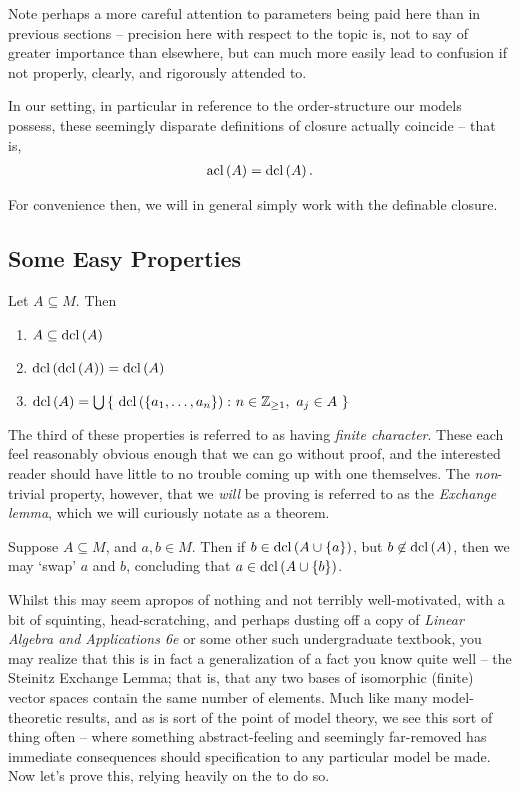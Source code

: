 Note perhaps a more careful attention to parameters being paid here than in previous sections -- precision here with respect to the topic is, not to say of greater importance than elsewhere, but can much more easily lead to confusion if not properly, clearly, and rigorously attended to.


In our setting, in particular in reference to the order-structure our models possess, these seemingly disparate definitions of closure actually coincide -- that is,
\begin{align*}
  \operatorname{acl}\left(A\right) = \operatorname{dcl}\left(A\right).
\end{align*}

For convenience then, we will in general simply work with the definable closure.

\subsection{Some Easy Properties}

\begin{proposition}
\leavevmode
Let $A \subseteq M$. Then
  \begin{enumerate}
    \item $A \subseteq \operatorname{dcl}\left(A\right)$
    \item $\operatorname{dcl}\left(\operatorname{dcl}\left(A\right)\right) = \operatorname{dcl}\left(A\right)$
    \item $\dcl{A} = \bigcup \left\{ \ \dcl{\{a_1, \hdots, a_n\}} \colon n \in \Zgeq{1}, \ a_j \in A \ \right\}$
  \end{enumerate}
\end{proposition}

The third of these properties is referred to as having \emph{finite character}. These each feel reasonably obvious enough that we can go without proof, and the interested reader should have little to no trouble coming up with one themselves. The \emph{non}-trivial property, however, that we \emph{will} be proving is referred to as the \emph{Exchange lemma}, which we will curiously notate as a theorem.

\begin{theorem}
  \label{thm:exchange}
  Suppose $A \subseteq M$, and $a, b \in M$. Then if $b \in \operatorname{dcl}\left(A \cup \{ a \}\right)$, but $b \not\in \operatorname{dcl}\left(A\right)$, then we may `swap' $a$ and $b$, concluding that $a \in \operatorname{dcl}\left(A \cup \{ b \}\right)$.
\end{theorem}

Whilst this may seem apropos of nothing and not terribly well-motivated, with a bit of squinting, head-scratching, and perhaps dusting off a copy of \emph{Linear Algebra and Applications 6e} or some other such undergraduate textbook, you may realize that this is in fact a generalization of a fact you know quite well -- the Steinitz Exchange Lemma; that is, that any two bases of isomorphic (finite) vector spaces contain the same number of elements. Much like many model-theoretic results, and as is sort of the point of model theory, we see this sort of thing often -- where something abstract-feeling and seemingly far-removed has immediate consequences should specification to any particular model be made. Now let's prove this, relying heavily on the \Mt to do so.


